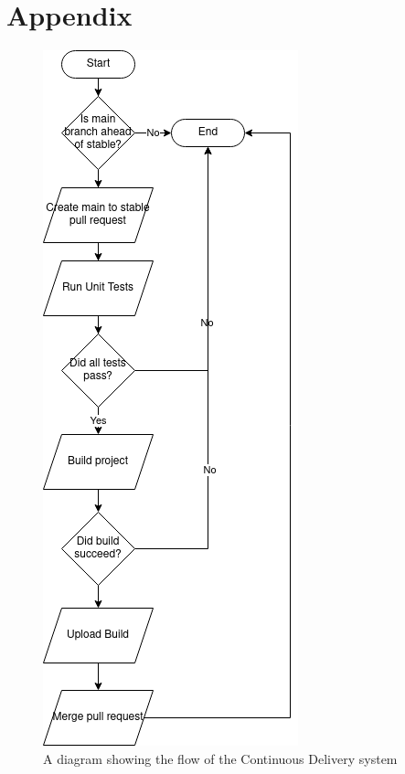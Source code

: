 \documentclass[journal]{IEEEtran}
\begin{document}
    \section{Appendix}
    \begin{figure}
        \includegraphics[width=0.95\columnwidth]{Images/CD.png}
        \caption{A diagram showing the flow of the Continuous Delivery system}
        \label{CDflow}
    \end{figure}
    
\end{document}
